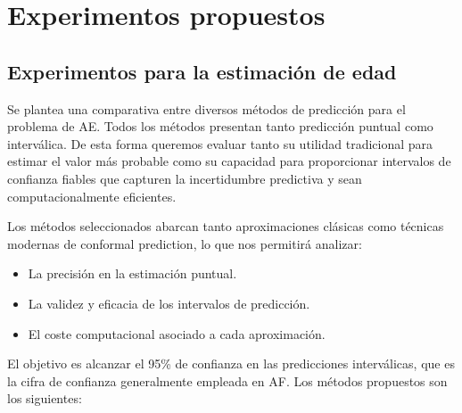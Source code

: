 
\section{Experimentos propuestos}


\subsection{Experimentos para la estimación de edad}

Se plantea una comparativa entre diversos métodos de predicción para el problema de AE. 
Todos los métodos presentan tanto predicción puntual como interválica. De esta forma queremos evaluar
tanto su utilidad tradicional para estimar el valor más probable como su capacidad para proporcionar
intervalos de confianza fiables que capturen la incertidumbre predictiva y sean computacionalmente eficientes.

Los métodos seleccionados abarcan tanto aproximaciones clásicas como técnicas modernas de conformal prediction,
lo que nos permitirá analizar:
\begin{itemize}
    \item La precisión en la estimación puntual.
    \item La validez y eficacia de los intervalos de predicción.
    \item El coste computacional asociado a cada aproximación.
\end{itemize}

El objetivo es alcanzar el 95\% de confianza en las predicciones interválicas, que es la cifra de confianza
generalmente empleada en AF. 
Los métodos propuestos son los siguientes: 

